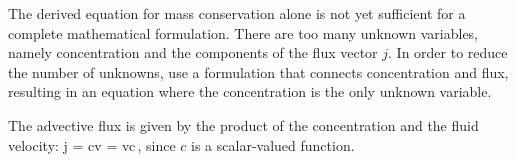 The derived equation for mass conservation alone is not yet sufficient for a complete mathematical formulation. There are too many unknown variables, namely concentration and the components of the flux vector $j$. In order to reduce the number of unknowns, use a formulation that connects concentration and flux, resulting in an equation where the concentration is the only unknown variable.

The advective flux is given by the product of the concentration and the fluid velocity:
\beq
j = cv = vc\,,
\eeq
since $c$ is a scalar-valued function.








